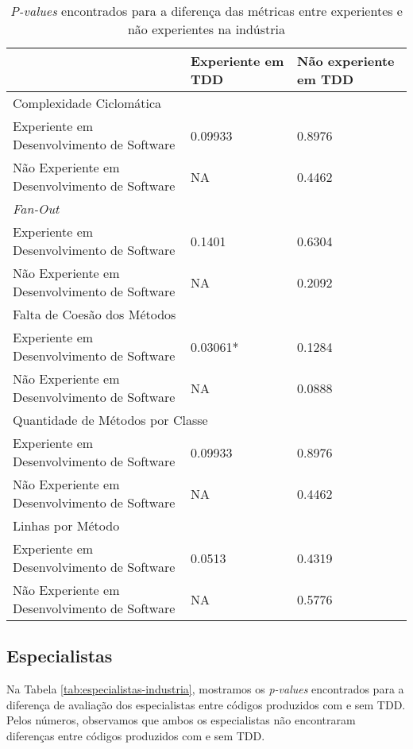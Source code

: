 \documentclass[conference]{IEEEtran}
\begin{document}
\begin{table}
	\centering
	\begin{tabular}{ | p{3cm} | p{2cm} | p{2cm} | }
		\hline
		  & \textbf{Experiente em TDD} & \textbf{Não experiente em TDD} \\
		\hline
			\multicolumn{3}{|l|}{Complexidade Ciclomática} \\
		\hline
			Experiente em Desenvolvimento de Software 		& 0.09933	&	0.8976\\
			\hline
			Não Experiente em Desenvolvimento de Software 	& NA		&	0.4462\\
		\hline
			\multicolumn{3}{|l|}{\textit{Fan-Out}}\\
		\hline
			Experiente em Desenvolvimento de Software 		& 0.1401	&	0.6304\\
			\hline
			Não Experiente em Desenvolvimento de Software 	& NA		&	0.2092\\
		\hline
			\multicolumn{3}{|l|}{Falta de Coesão dos Métodos}\\
		\hline
			Experiente em Desenvolvimento de Software 		& \cellcolor[gray]{0.8}0.03061*	&	0.1284\\
			\hline
			Não Experiente em Desenvolvimento de Software 	& NA		&	0.0888\\
		\hline
			\multicolumn{3}{|l|}{Quantidade de Métodos por Classe} \\
		\hline
			Experiente em Desenvolvimento de Software 		& 0.09933	&	0.8976\\
			\hline
			Não Experiente em Desenvolvimento de Software 	& NA		&	0.4462\\
		\hline
			\multicolumn{3}{|l|}{Linhas por Método}\\
		\hline
			Experiente em Desenvolvimento de Software 		& 0.0513	&	0.4319\\
			\hline
			Não Experiente em Desenvolvimento de Software 	& NA		&	0.5776\\
		\hline
	\end{tabular}
	\caption{\textit{P-values} encontrados para a diferença das métricas entre experientes e não experientes na indústria}
	\label{valores-separados}
\end{table}

\subsection{Especialistas}

Na Tabela
\ref{tab:especialistas-industria},
mostramos os \textit{p-values} encontrados para a diferença de avaliação dos especialistas
entre códigos produzidos com e sem TDD.
Pelos números, observamos que ambos os especialistas não encontraram diferenças 
entre códigos produzidos com e sem TDD. 
\end{document}

